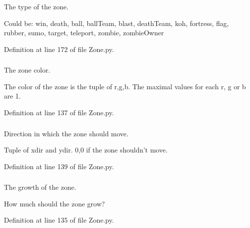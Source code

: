 The type of the zone. 

Could be: win, death, ball, ballTeam, blast, deathTeam, koh, fortress, flag, rubber, sumo, target, teleport, zombie, zombieOwner 

Definition at line 172 of file Zone.py.

\hypertarget{class_zone_1_1_zone_a0e94d3602835417fef9d1345cf1e739c}{
\subsubsection[{color}]{}}
\label{class_zone_1_1_zone_a0e94d3602835417fef9d1345cf1e739c}


The zone color. 

The color of the zone is the tuple of r,g,b. The maximal values for each r, g or b are 1. 

Definition at line 137 of file Zone.py.

\hypertarget{class_zone_1_1_zone_a20a50ae6ea7f05c4bb403ef0306ba83f}{
\subsubsection[{dir}]{}}
\label{class_zone_1_1_zone_a20a50ae6ea7f05c4bb403ef0306ba83f}


Direction in which the zone should move. 

Tuple of xdir and ydir. 0,0 if the zone shouldn't move. 

Definition at line 139 of file Zone.py.

\hypertarget{class_zone_1_1_zone_a42d231813671766976464bbf2dfdf387}{
\subsubsection[{growth}]{}}
\label{class_zone_1_1_zone_a42d231813671766976464bbf2dfdf387}


The growth of the zone. 

How much should the zone grow? 

Definition at line 135 of file Zone.py.

\hypertarget{class_zone_1_1_zone_a574bf43b0f15767743c104faabbae973}{
\subsubsection[{interactive}]{}}
\label{class_zone_1_1_zone_a574bf43b0f15767743c104faabbae973}


